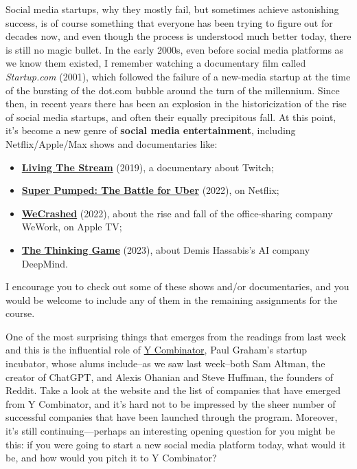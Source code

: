 \documentclass[
  letterpaper,
  DIV=11,
  numbers=noendperiod,
  oneside]{scrartcl}
\providecommand{\tightlist}{%
  \setlength{\itemsep}{0pt}\setlength{\parskip}{0pt}}\usepackage{longtable,booktabs,array}
\begin{document}
Social media startups, why they mostly fail, but sometimes achieve
astonishing success, is of course something that everyone has been
trying to figure out for decades now, and even though the process is
understood much better today, there is still no magic bullet. In the
early 2000s, even before social media platforms as we know them existed,
I remember watching a documentary film called \emph{Startup.com} (2001),
which followed the failure of a new-media startup at the time of the
bursting of the dot.com bubble around the turn of the millennium. Since
then, in recent years there has been an explosion in the historicization
of the rise of social media startups, and often their equally
precipitous fall. At this point, it's become a new genre of
\textbf{social media entertainment}, including Netflix/Apple/Max shows
and documentaries like:

\begin{itemize}
\tightlist
\item
  \href{https://youtu.be/_pXyTCYdzBA}{\textbf{Living The Stream}}
  (2019), a documentary about Twitch;
\item
  \href{https://youtu.be/VMP21LO0Guc}{\textbf{Super Pumped: The Battle
  for Uber}} (2022), on Netflix;
\item
  \href{https://youtu.be/UREIAoL0Spk}{\textbf{WeCrashed}} (2022), about
  the rise and fall of the office-sharing company WeWork, on Apple TV;
\item
  \href{https://youtu.be/utDDwu6zfTc}{\textbf{The Thinking Game}}
  (2023), about Demis Hassabis's AI company DeepMind.
\end{itemize}

I encourage you to check out some of these shows and/or documentaries,
and you would be welcome to include any of them in the remaining
assignments for the course.

One of the most surprising things that emerges from the readings from
last week and this is the influential role of
\href{https://www.ycombinator.com/}{Y Combinator}, Paul Graham's startup
incubator, whose alums include--as we saw last week--both Sam Altman,
the creator of ChatGPT, and Alexis Ohanian and Steve Huffman, the
founders of Reddit. Take a look at the website and the list of companies
that have emerged from Y Combinator, and it's hard not to be impressed
by the sheer number of successful companies that have been launched
through the program. Moreover, it's still continuing---perhaps an
interesting opening question for you might be this: if you were going to
start a new social media platform today, what would it be, and how would
you pitch it to Y Combinator?
\end{document}
